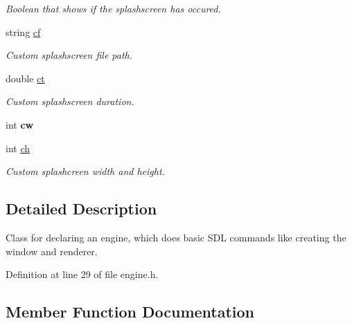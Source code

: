 \begin{DoxyCompactItemize}
\begin{DoxyCompactList}\small\item\em Boolean that shows if the splashscreen has occured. \end{DoxyCompactList}\item 
string \hyperlink{classEngine_af5917b4f27bb16bf68b074b62c0e5587}{cf}\hypertarget{classEngine_af5917b4f27bb16bf68b074b62c0e5587}{}\label{classEngine_af5917b4f27bb16bf68b074b62c0e5587}

\begin{DoxyCompactList}\small\item\em Custom splashscreen file path. \end{DoxyCompactList}\item 
double \hyperlink{classEngine_a6e76eccd4f6e976a2068b9eb0acb4e85}{ct}\hypertarget{classEngine_a6e76eccd4f6e976a2068b9eb0acb4e85}{}\label{classEngine_a6e76eccd4f6e976a2068b9eb0acb4e85}

\begin{DoxyCompactList}\small\item\em Custom splashscreen duration. \end{DoxyCompactList}\item 
int {\bfseries cw}\hypertarget{classEngine_aff6e103dd58c2ea3b7798e7bc52db361}{}\label{classEngine_aff6e103dd58c2ea3b7798e7bc52db361}

\item 
int \hyperlink{classEngine_a2acd0bd074160e654d076376d36a3479}{ch}\hypertarget{classEngine_a2acd0bd074160e654d076376d36a3479}{}\label{classEngine_a2acd0bd074160e654d076376d36a3479}

\begin{DoxyCompactList}\small\item\em Custom splashcreen width and height. \end{DoxyCompactList}\end{DoxyCompactItemize}


\subsection{Detailed Description}
Class for declaring an engine, which does basic S\+DL commands like creating the window and renderer. 

Definition at line 29 of file engine.\+h.



\subsection{Member Function Documentation}
